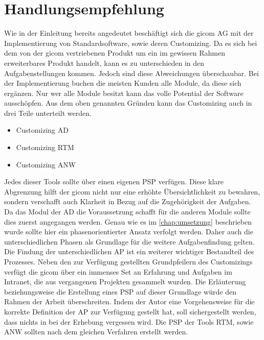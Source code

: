 \chapter{Handlungsempfehlung}
\label{chap:handlungs}

	Wie in der Einleitung bereits angedeutet beschäftigt sich die gicom AG mit der Implementierung von Standardsoftware, sowie deren Customizing. Da es sich bei dem von der gicom vertriebenen Produkt um ein im gewissen Rahmen erweiterbares Produkt handelt, kann es zu unterschieden in den Aufgabenstellungen kommen. Jedoch sind diese Abweichungen überschaubar. Bei der Implementierung buchen die meisten Kunden alle Module, da diese sich ergänzen. Nur wer alle Module besitzt kann das volle Potential der Software ausschöpfen. 
	Aus dem oben genannten Gründen kann das Customizing auch in drei Teile unterteilt werden. 
	
	\begin{itemize}
		\item Customizing \ac{AD}
		\item Customizing \ac{RTM}
		\item Customizing \ac{ANW}
	\end{itemize}

	Jedes dieser Tools sollte über einen eigenen \acs{PSP} verfügen. Diese klare Abgrenzung hilft der gicom nicht nur eine erhöhte Übersichtlichkeit zu bewahren, sondern verschafft auch Klarheit in Bezug auf die Zugehörigkeit der Aufgaben. Da das Modul der \ac{AD} die Voraussetzung schafft für die anderen Module sollte dies zuerst angegangen werden. Genau wie es im \autoref{chap:umsetzung} beschrieben wurde sollte hier ein phasenorientierter Ansatz verfolgt werden. Daher auch die unterschiedlichen Phasen als Grundlage für die weitere Aufgabenfindung gelten. Die Findung der unterschiedlichen \ac{AP} ist ein weiterer wichtiger Bestandteil des Prozesses. Neben den zur Verfügung gestellten Grundpfeilern des Customizings verfügt die gicom über ein immenses Set an Erfahrung und Aufgaben im Intranet, die aus vergangenen Projekten gesammelt wurden. Die Erläuterung beziehungsweise die Erstellung eines \acs{PSP} auf dieser Grundlage würde den Rahmen der Arbeit überschreiten. Indem der Autor eine Vorgehensweise für die korrekte Definition der \acs{AP} zur Verfügung gestellt hat, soll sichergestellt werden, dass nichts in bei der Erhebung vergessen wird. 
	Die \acs{PSP} der Tools \acs{RTM}, sowie \acs{ANW} sollten nach dem gleichen Verfahren erstellt werden. 
	